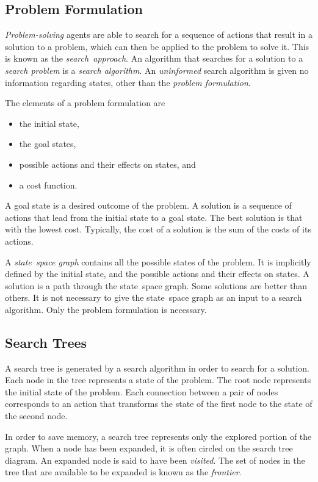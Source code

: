 \subsection{Problem Formulation}

\emph{Problem-solving} agents are able to search for a sequence of actions that result in a solution to a problem, which can then be applied to the problem to solve it.
This is known as the \emph{search~approach}.
An algorithm that searches for a solution to a \emph{search problem} is a \emph{search algorithm}.
An \emph{uninformed} search algorithm is given no information regarding states, other than the \emph{problem formulation}.

The elements of a problem formulation are
\begin{itemize}
  \item the initial state,
  \item the goal states,
  \item possible actions and their effects on states, and
  \item a cost function.
\end{itemize}

A goal state is a desired outcome of the problem.
A solution is a sequence of actions that lead from the initial state to a goal state.
The best solution is that with the lowest cost.
Typically, the cost of a solution is the sum of the costs of its actions.

A \emph{state~space graph} contains all the possible states of the problem.
It is implicitly defined by the initial state, and the possible actions and their effects on states.
A solution is a path through the state~space graph.
Some solutions are better than others.
It is not necessary to give the state~space graph as an input to a search algorithm.
Only the problem formulation is necessary.

\subsection{Search Trees}

A search tree is generated by a search algorithm in order to search for a solution.
Each node in the tree represents a state of the problem.
The root node represents the initial state of the problem.
Each connection between a pair of nodes corresponds to an action that transforms the state of the first node to the state of the second node.

In order to save memory, a search tree represents only the explored portion of the graph.
When a node has been expanded, it is often circled on the search tree diagram.
An expanded node is said to have been \emph{visited}.
The set of nodes in the tree that are available to be expanded is known as the \emph{frontier}.

